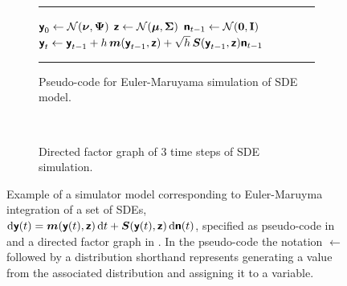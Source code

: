 \begin{figure}[!t]
\centering
\begin{subfigure}[b]{\linewidth}
\vskip 0pt
\centering
\hrule
\vskip 3pt
\begin{algorithmic}
\small
\State $\rvct{y}_0 \gets \nrm{\vct{\nu},\mtx{\Psi}}$
\State $\rvct{z} \gets \nrm{\vct{\mu},\mtx{\Sigma}}$
  \State $\rvct{n}_{t-1} \gets \nrm{\vct{0},\mathbf{I}}$
  \State $\boldsymbol{\mathsf{y}}_{t} \gets \boldsymbol{\mathsf{y}}_{t-1} + h \, \boldsymbol{m}(\boldsymbol{\mathsf{y}}_{t-1},\boldsymbol{\mathsf{z}}) + \sqrt{h} \, \boldsymbol{S}(\boldsymbol{\mathsf{y}}_{t-1},\boldsymbol{\mathsf{z}})\boldsymbol{\mathsf{n}}_{t-1}$
\EndFor
\end{algorithmic}
\vskip 3pt
\hrule
\vskip 3pt
\captionsetup{justification=centering}
\caption{Pseudo-code for Euler-Maruyama simulation of \ac{SDE} model. } %
\label{sfig:sim-model-code} %
\end{subfigure}%
\\[2ex]
\begin{subfigure}[b]{\linewidth}
\vskip 0pt
\centering
{}
\caption{Directed factor graph of 3 time steps of \ac{SDE} simulation.}
\label{sfig:sim-model-factor-graph}
\end{subfigure}%
\caption[Simulator model example.]{Example of a simulator model corresponding to Euler-Maruyma integration of a set of \acfp{SDE}, \\$\dr \rvct{y}(t) = \vct{m}\lpa\rvct{y}(t),\rvct{z}\rpa \,\dr t + \mtx{S}\lpa\rvct{y}(t),\rvct{z}\rpa \, \dr\rvct{n}(t)$, specified as pseudo-code in  and a directed factor graph in . In the pseudo-code the notation $\gets$ followed by a distribution shorthand represents generating a value from the associated distribution and assigning it to a variable.} %
\label{fig:simulator-model-example}
\end{figure}

